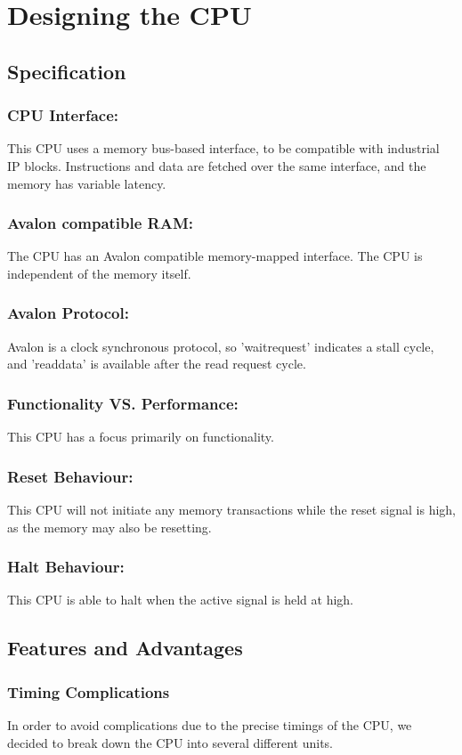 \documentclass{article}
\begin{document}
\section{Designing the CPU}

\subsection{Specification}

\subsubsection{CPU Interface:} This CPU uses a memory bus-based interface, to be compatible with industrial IP blocks. Instructions and data are fetched over the same interface, and the memory has variable latency.
\subsubsection{Avalon compatible RAM:} The CPU has an Avalon compatible memory-mapped interface. The CPU is independent of the memory itself. 
\subsubsection{Avalon Protocol:} Avalon is a clock synchronous protocol, so 'waitrequest' indicates a stall cycle, and 'readdata' is available after the read request cycle.
\subsubsection{Functionality VS. Performance:} This CPU has a focus primarily on functionality.
\subsubsection{Reset Behaviour:} This CPU will not initiate any memory transactions while the reset signal is high, as the memory may also be resetting. 
\subsubsection{Halt Behaviour:} This CPU is able to halt when the active signal is held at high. 

\subsection{Features and Advantages}

\subsubsection{Timing Complications}
In order to avoid complications due to the precise timings of the CPU, we decided to break down the CPU into several different units. 
\end{document}
